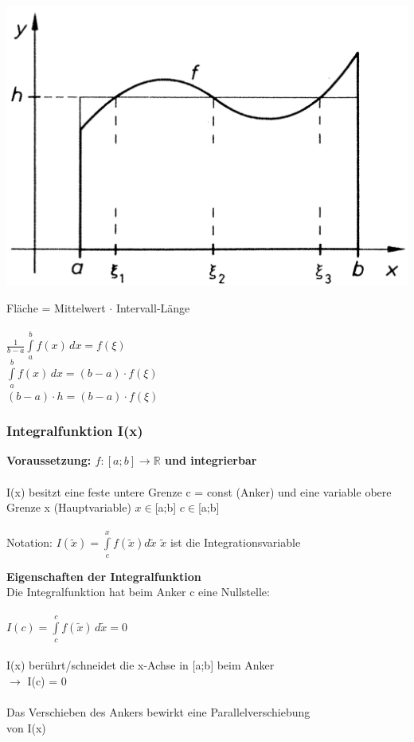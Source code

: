 		\begin{minipage}{0.40\linewidth}
		\includegraphics[width=0.95\linewidth]{Bilder/MWS-integral} \\
		\end{minipage}
		\hfill				
		\begin{minipage}{0.55\linewidth}
		
		Fläche =  Mittelwert $\cdot$ Intervall-Länge \\
		\\ 
		 $\frac{1}{b-a} \int \limits_{a}^{b} f(x) \, dx = f(\xi)$ \\
		$ \int \limits_{a}^{b} f(x) \, dx = (b-a) \cdot f(\xi)$ \\
		$ (b-a) \cdot h = (b-a) \cdot f(\xi)$ \\
		\end{minipage}
		
		
		\subsubsection{Integralfunktion I(x)}
		\textbf{Voraussetzung: $f: [a;b] \rightarrow \mathbb{R}$ und integrierbar} \\
		 \\
		 I(x) besitzt eine feste untere Grenze c = const (Anker) und eine variable obere Grenze x (Hauptvariable) \quad $x \in $[a;b] \qquad  $c \in $[a;b] \\
		 \\
		 Notation: $I(\tilde{x}) = \int \limits_{c}^{x} f(\tilde{x}) d\tilde{x} $  \qquad $\tilde{x}$ ist die Integrationsvariable 
		 
		 
		 \textbf{Eigenschaften der Integralfunktion}\\
			Die Integralfunktion hat beim Anker c eine Nullstelle: \\
			\\
			$I(c) = \int \limits_{c}^{c} f(\tilde{x}) \, d\tilde{x} = 0 $  \\
		\\	
		I(x) berührt/schneidet die x-Achse in [a;b] beim Anker \\
		$\rightarrow$ I(c) = 0 \\
		\\
		Das Verschieben des Ankers bewirkt eine Parallelverschiebung \\ 
		von I(x) \\
		
